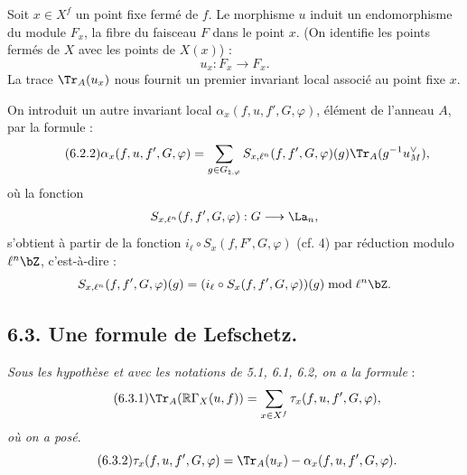 Soit $x\in X^f$ un point fixe fermé de $f$. Le morphisme $u$ induit un endomorphisme du module $F_x$, la fibre du faisceau $F$ dans le point $x$. (On identifie les points fermés de $X$ avec les points de $X(x)$) :
\[
u_x:F_x\longrightarrow F_x .
\]
La trace $\Tr_A(u_x)$ nous fournit un premier invariant local associé au point fixe $x$.

On introduit un autre invariant local $\alpha_x(f,u,f',G,\varphi)$, élément de l'anneau $A$, par la formule :
\begin{equation}\tag{6.2.2}
\alpha_x(f,u,f',G,\varphi)=
\sum_{g\in G_{\natural,\varphi}}
S_{x,\ell^n}(f,f',G,\varphi)(g)\Tr_A(g^{-1}u_M^\vee),
\end{equation}
où la fonction
\[
S_{x,\ell^n}(f,f',G,\varphi):G\longrightarrow\La_n,
\]
s'obtient à partir de la fonction $i_\ell\circ S_x(f,F',G,\varphi)$ (cf. 4) par réduction modulo $\ell^n\bZ$, c'est-à-dire :\[
S_{x,\ell^n}(f,f',G,\varphi)(g)=
(i_\ell\circ S_x(f,f',G,\varphi))(g)\bmod \ell^n\bZ.
\]

\subsection*{6.3. Une formule de Lefschetz.}
\emph{Sous les hypothèse et avec les notations de 5.1, 6.1, 6.2, on a la formule} :
\begin{equation}
\tag{6.3.1}
\Tr_A(\mathbb{R}\Gamma_X(u,f))=\sum_{x\in X^f}\tau_x(f,u,f',G,\varphi),
\end{equation}
\emph{où on a posé}.
\begin{equation}
\tag{6.3.2}
\tau_x(f,u,f',G,\varphi)=\Tr_A(u_x)-\alpha_x(f,u,f',G,\varphi).
\end{equation}

